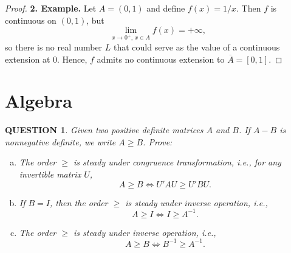 \documentclass[12pt]{article}
\renewcommand{\(}{\left(}%
\renewcommand{\)}{\right)}%
\renewcommand{\[}{\left[}%
\renewcommand{\]}{\right]}%
\newtheorem{question}{QUESTION}[section]}
\newtheorem{proof}{Proof.}}
\begin{document}
\begin{proof}
\bigskip
\noindent
\textbf{2. Example.}
Let $A=(0,1)$ and define $f(x)=1/x$. Then $f$ is continuous on $(0,1)$, but
\begin{equation*}
\lim_{x\to 0^+,\, x\in A} f(x)=+\infty,
\end{equation*}
so there is no real number $L$ that could serve as the value of a continuous extension at $0$. Hence, $f$ admits no continuous
extension to $\overline{A}=[0,1]$.

\end{proof}

\section{Algebra}
\begin{question}
	Given two positive definite matrices $A$ and $B$. If $A-B$ is nonnegative definite, we write $A\geq B$. Prove:
	\begin{enumerate}[(a)]
		\item The order $\geq$ is steady under congruence transformation, i.e., for any invertible matrix $U$,
		\begin{equation*}
			A\geq B\Longleftrightarrow U'AU\geq U'BU.
		\end{equation*}
		\item If $B=I$, then the order $\geq$ is steady under inverse operation, i.e., 
		\begin{equation*}
			A\geq I\Longleftrightarrow I\geq A^{-1}.
		\end{equation*}
		\item The order $\geq$ is steady under inverse operation, i.e., 
		\begin{equation*}
			A\geq B\Longleftrightarrow B^{-1}\geq A^{-1}.
		\end{equation*}
	\end{enumerate} 
\end{question}
\end{document}
